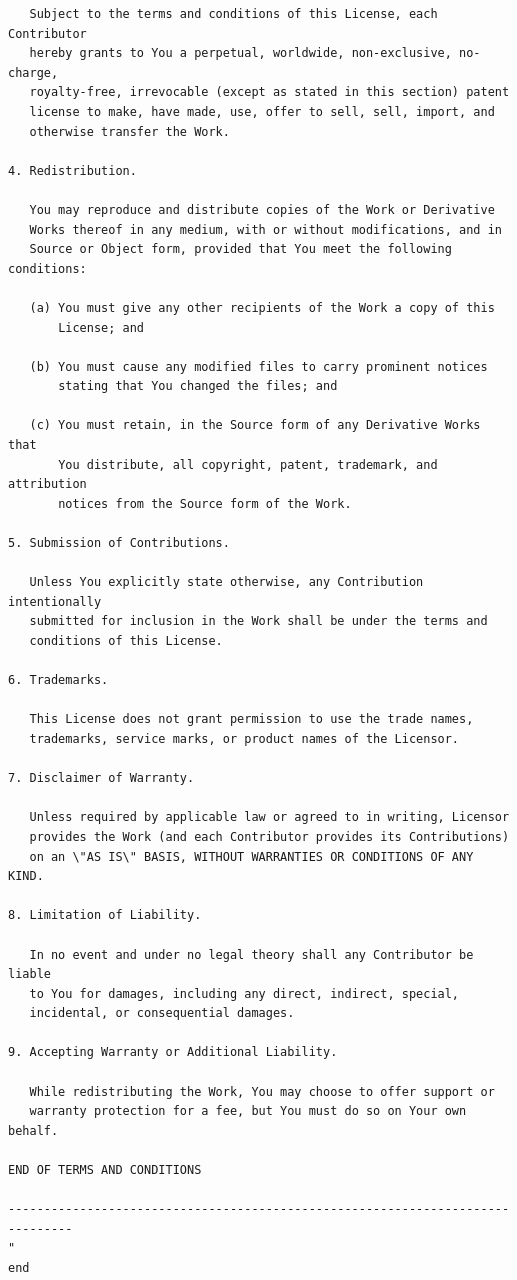 \documentclass[12pt,a4paper]{article}
\begin{document}
\begin{verbatim}
   Subject to the terms and conditions of this License, each Contributor
   hereby grants to You a perpetual, worldwide, non-exclusive, no-charge,
   royalty-free, irrevocable (except as stated in this section) patent
   license to make, have made, use, offer to sell, sell, import, and
   otherwise transfer the Work.

4. Redistribution.

   You may reproduce and distribute copies of the Work or Derivative
   Works thereof in any medium, with or without modifications, and in
   Source or Object form, provided that You meet the following conditions:

   (a) You must give any other recipients of the Work a copy of this
       License; and

   (b) You must cause any modified files to carry prominent notices
       stating that You changed the files; and

   (c) You must retain, in the Source form of any Derivative Works that
       You distribute, all copyright, patent, trademark, and attribution
       notices from the Source form of the Work.

5. Submission of Contributions.

   Unless You explicitly state otherwise, any Contribution intentionally
   submitted for inclusion in the Work shall be under the terms and
   conditions of this License.

6. Trademarks.

   This License does not grant permission to use the trade names,
   trademarks, service marks, or product names of the Licensor.

7. Disclaimer of Warranty.

   Unless required by applicable law or agreed to in writing, Licensor
   provides the Work (and each Contributor provides its Contributions)
   on an \"AS IS\" BASIS, WITHOUT WARRANTIES OR CONDITIONS OF ANY KIND.

8. Limitation of Liability.

   In no event and under no legal theory shall any Contributor be liable
   to You for damages, including any direct, indirect, special,
   incidental, or consequential damages.

9. Accepting Warranty or Additional Liability.

   While redistributing the Work, You may choose to offer support or
   warranty protection for a fee, but You must do so on Your own behalf.

END OF TERMS AND CONDITIONS

-------------------------------------------------------------------------------
"
end
\end{verbatim}
\end{document}
